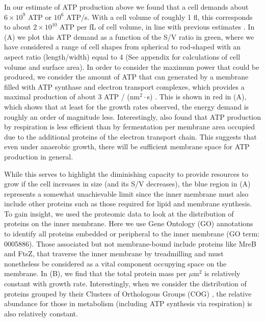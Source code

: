 In our estimate of ATP production above we found that a cell demands about
$6 \times 10^9$ ATP or $10^6$ ATP/s. With a cell volume of roughly 1 fl, this
corresponds to about $2 \times 10^{10}$ ATP per fL of cell volume, in line  with
previous estimates \citep{stouthamer1977, szenk2017}. In  (A)
we plot this ATP demand as a function of the S/V ratio in green, where we have
considered a range of cell shapes from spherical to rod-shaped with an aspect
ratio (length/width) equal to 4 (See appendix for calculations of cell volume
and surface area).  In order to consider the maximum power that could be
produced, we consider the amount of ATP that can generated by a membrane filled
with ATP synthase and electron transport complexes, which provides a maximal
production of about 3 ATP / (nm$^2 \cdot$s) \citep{szenk2017}. This is shown in
red in (A), which shows that at least for the growth rates
observed, the energy demand is roughly an order of magnitude less.  
Interestingly, \cite{szenk2017} also found that ATP production by
respiration is less efficient than by fermentation per membrane area occupied
due to the additional proteins of the electron transport chain. This suggests
that even under anaerobic growth, there will be sufficient membrane space for
ATP production in general.

While this serves to highlight the diminishing capacity to provide resources to
grow if the cell increases in size (and its S/V decreases), the blue region in
(A) represents a somewhat unachievable limit since the inner
membrane must also include other proteins such as those required for lipid and
membrane synthesis. To gain insight, we used the proteomic data
to look at the distribution of proteins on the inner membrane. Here we use Gene
Ontology (GO) annotations \citep{ashburner2000,thegeneOntologyconsortium2018} to
identify all proteins embedded or peripheral to the inner membrane (GO term:
0005886). Those associated but not membrane-bound include proteins like MreB and
FtsZ, that traverse the inner membrane by treadmilling and must nonetheless be
considered as a vital component occupying space on the membrane. In
 (B), we find that the total protein mass per $\mu$m$^2$ is
relatively constant with growth rate. Interestingly, when we consider the
distribution of proteins grouped by their Clusters of Orthologous Groups (COG)
\citep{tatusov2000}, the relative abundance for those in metabolism
(including ATP synthesis via respiration) is also relatively constant.

